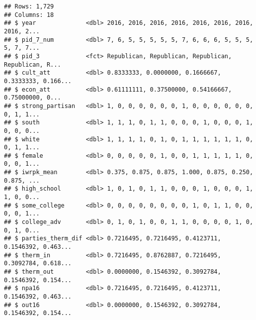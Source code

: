 \documentclass[
]{article}
\newenvironment{Shaded}{\begin{snugshade}}{\end{snugshade}}
\newcommand{\DecValTok}[1]{\textcolor[rgb]{0.00,0.00,0.81}{#1}}
\newcommand{\KeywordTok}[1]{\textcolor[rgb]{0.13,0.29,0.53}{\textbf{#1}}}
\newcommand{\NormalTok}[1]{#1}
\newcommand{\OperatorTok}[1]{\textcolor[rgb]{0.81,0.36,0.00}{\textbf{#1}}}
\newcommand{\StringTok}[1]{\textcolor[rgb]{0.31,0.60,0.02}{#1}}
\begin{document}
\begin{verbatim}
## Rows: 1,729
## Columns: 18
## $ year              <dbl> 2016, 2016, 2016, 2016, 2016, 2016, 2016, 2016, 2...
## $ pid_7_num         <dbl> 7, 6, 5, 5, 5, 5, 5, 7, 6, 6, 6, 5, 5, 5, 5, 7, 7...
## $ pid_3             <fct> Republican, Republican, Republican, Republican, R...
## $ cult_att          <dbl> 0.8333333, 0.0000000, 0.1666667, 0.3333333, 0.166...
## $ econ_att          <dbl> 0.61111111, 0.37500000, 0.54166667, 0.75000000, 0...
## $ strong_partisan   <dbl> 1, 0, 0, 0, 0, 0, 0, 1, 0, 0, 0, 0, 0, 0, 0, 1, 1...
## $ south             <dbl> 1, 1, 1, 0, 1, 1, 0, 0, 0, 1, 0, 0, 0, 1, 0, 0, 0...
## $ white             <dbl> 1, 1, 1, 1, 0, 1, 0, 1, 1, 1, 1, 1, 1, 0, 0, 1, 1...
## $ female            <dbl> 0, 0, 0, 0, 0, 1, 0, 0, 1, 1, 1, 1, 1, 0, 0, 0, 1...
## $ iwrpk_mean        <dbl> 0.375, 0.875, 0.875, 1.000, 0.875, 0.250, 0.875, ...
## $ high_school       <dbl> 1, 0, 1, 0, 1, 1, 0, 0, 0, 1, 0, 0, 0, 1, 1, 0, 0...
## $ some_college      <dbl> 0, 0, 0, 0, 0, 0, 0, 0, 1, 0, 1, 1, 0, 0, 0, 0, 1...
## $ college_adv       <dbl> 0, 1, 0, 1, 0, 0, 1, 1, 0, 0, 0, 0, 1, 0, 0, 1, 0...
## $ parties_therm_dif <dbl> 0.7216495, 0.7216495, 0.4123711, 0.1546392, 0.463...
## $ therm_in          <dbl> 0.7216495, 0.8762887, 0.7216495, 0.3092784, 0.618...
## $ therm_out         <dbl> 0.0000000, 0.1546392, 0.3092784, 0.1546392, 0.154...
## $ npa16             <dbl> 0.7216495, 0.7216495, 0.4123711, 0.1546392, 0.463...
## $ out16             <dbl> 0.0000000, 0.1546392, 0.3092784, 0.1546392, 0.154...
\end{verbatim}

\begin{Shaded}
\end{Shaded}
\end{document}

